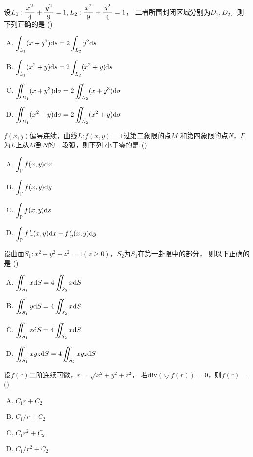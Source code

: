 \begin{frame}
	\linespread{1.5}
	设$L_1:\displaystyle\frac{\,{x^2}\,}{\,{4}\,}+\displaystyle\frac{\,{y^2}\,}{\,{9}\,}=1,L_2:
	\displaystyle\frac{\,{x^2}\,}{\,{9}\,}+\displaystyle\frac{\,{y^2}\,}{\,{4}\,}=1$，
	二者所围封闭区域分别为$D_1,D_2$，则下列正确的是
	(\underline{\;})
	\begin{enumerate}[(A)]
	  \item $\displaystyle\int_{L_1}(x+y^2)\mathrm{d} s=2\displaystyle\int_{L_2}y^2\mathrm{d} s$
	  \item $\displaystyle\int_{L_1}(x^2+y)\mathrm{d} s=2\displaystyle\int_{L_2}(x^2+y)\mathrm{d} s$
	  \item $\displaystyle\iint_{D_1}(x+y^3)\mathrm{d}\sigma=2\displaystyle\iint_{D_2}(x+y^3)\mathrm{d}\sigma$
	  \item $\displaystyle\iint_{D_1}(x^2+y)\mathrm{d}\sigma=2\displaystyle\iint_{D_2}(x^2+y)\mathrm{d}\sigma$
	\end{enumerate}
\end{frame}

\begin{frame}
	\linespread{1.5}
	$f(x,y)$偏导连续，曲线$L:f(x,y)=1$过第二象限的点$M$
	  和第四象限的点$N$，$\Gamma$为$L$上从$M$到$N$的一段弧，则下列
	  小于零的是
	(\underline{\;})
	\begin{enumerate}[(A)]
	  \item $\displaystyle\int_{\Gamma}f(x,y)\mathrm{d} x$
	  \item $\displaystyle\int_{\Gamma}f(x,y)\mathrm{d} y$
	  \item $\displaystyle\int_{\Gamma}f(x,y)\mathrm{d} s$
	  \item $\displaystyle\int_{\Gamma}f\,'_x(x,y)\mathrm{d} x+f\,'_y(x,y)\mathrm{d} y$
	\end{enumerate}
\end{frame}

\begin{frame}
	\linespread{1.5}
	设曲面$S_1:x^2+y^2+z^2=1(z\geq
	  0)$，$S_2$为$S_1$在第一卦限中的部分，
	  则以下正确的是
	(\underline{\;})
	\begin{enumerate}[(A)]
	  \item $\displaystyle\iint_{S_1}x\mathrm{d} S=4\iint_{S_2}x\mathrm{d} S$
	  \item $\displaystyle\iint_{S_1}y\mathrm{d} S=4\iint_{S_2}x\mathrm{d} S$
	  \item $\displaystyle\iint_{S_1}z\mathrm{d} S=4\iint_{S_2}x\mathrm{d} S$
	  \item $\displaystyle\iint_{S_1}xyz\mathrm{d} S=4\iint_{S_2}xyz\mathrm{d} S$
	\end{enumerate}
\end{frame}

\begin{frame}
	\linespread{1.5}
	设$f(r)$二阶连续可微，$r=\sqrt{x^2+y^2+z^2}$，
  	若$\mathrm{div}(\bigtriangledown\,f(r))=0$，则$f(r)=$
	(\underline{\;})
	\begin{enumerate}[(A)]
	  \item $C_1r+C_2$
      \item $C_1/r+C_2$
      \item $C_1r^2+C_2$
      \item $C_1/r^2+C_2$
	\end{enumerate}
\end{frame}

